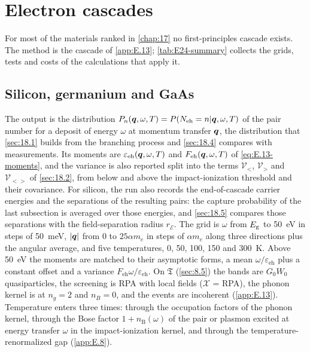 \section{Electron cascades}\label{app:E.24}

For most of the materials ranked in \cref{chap:17} no first-principles cascade exists. The method is the cascade of \cref{app:E.13}; \cref{tab:E24-summary} collects the grids, tests and costs of the calculations that apply it.

\subsection{Silicon, germanium and GaAs}

The output is the distribution $P_n(\bm{q}, \omega, T) = P(N_{\mathrm{eh}} = n|\bm{q}, \omega, T)$ of the pair number for a deposit of energy $\omega$ at momentum transfer $\bm{q}$, the distribution that \cref{sec:18.1} builds from the branching process and \cref{sec:18.4} compares with measurements. Its moments are $\varepsilon_{\mathrm{eh}}(\bm{q}, \omega, T)$ and $F_{\mathrm{eh}}(\bm{q}, \omega, T)$ of \cref{eq:E.13-moments}, and the variance is also reported split into the terms $\mathcal{V}_<$, $\mathcal{V}_>$ and $\mathcal{V}_{<>}$ of \cref{sec:18.2}, from below and above the impact-ionization threshold and their covariance. For silicon, the run also records the end-of-cascade carrier energies and the separations of the resulting pairs: the capture probability of the last subsection is averaged over those energies, and \cref{sec:18.5} compares those separations with the field-separation radius $r_{\mathcal{E}}$. The grid is $\omega$ from $E_{\mathrm{g}}$ to \SI{50}{eV} in steps of \SI{50}{meV}, $|\bm{q}|$ from 0 to $25\alpha m_e$ in steps of $\alpha m_e$ along three directions plus the angular average, and five temperatures, 0, 50, 100, 150 and \SI{300}{K}. Above \SI{50}{eV} the moments are matched to their asymptotic forms, a mean $\omega/\varepsilon_{\mathrm{eh}}$ plus a constant offset and a variance $F_{\mathrm{eh}}\omega/\varepsilon_{\mathrm{eh}}$. On $\mathfrak{T}$ (\cref{sec:8.5}) the bands are $G_0W_0$ quasiparticles, the screening is RPA with local fields ($\mathcal{X}$ = RPA), the phonon kernel is at $n_g = 2$ and $n_B = 0$, and the events are incoherent (\cref{app:E.13}). Temperature enters three times: through the occupation factors of the phonon kernel, through the Bose factor $1 + n_{\mathrm{B}}(\omega)$ of the pair or plasmon excited at energy transfer $\omega$ in the impact-ionization kernel, and through the temperature-renormalized gap (\cref{app:E.8}).

